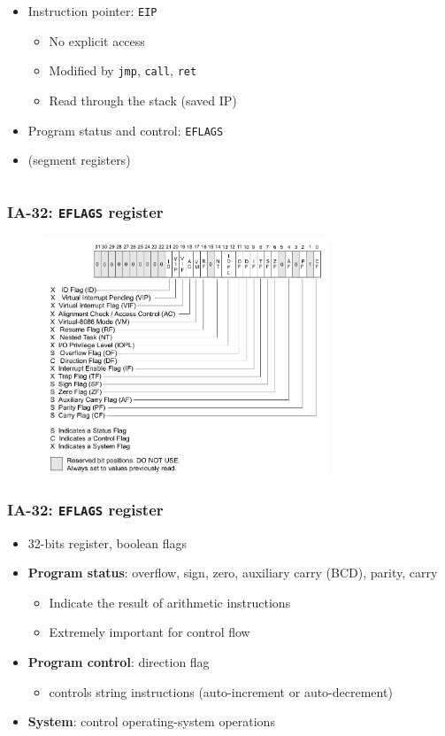 \documentclass[]{beamer}
\begin{document}
\begin{frame}
\begin{columns}
\begin{column}{2.7in}
\begin{itemize}
\begin{itemize}
	      		\end{itemize}
	      		\item Instruction pointer: {\tt EIP}
	      		\begin{itemize}
	      			\item No explicit access
	      			\item Modified by {\tt jmp}, {\tt call}, {\tt ret}
	      			\item Read through the stack (saved IP)
	      		\end{itemize}
	      		\item Program status and control: {\tt EFLAGS}
	      		\item (segment registers)
	      	\end{itemize}
    	\end{column}
  	\end{columns}
\end{frame}

\begin{frame}
	\frametitle{IA-32: {\tt EFLAGS} register}
	\begin{figure}
    	\includegraphics[height=2.8in]{images/intel-manual-eflags.png}
  	\end{figure}
\end{frame}

\begin{frame}
	\frametitle{IA-32: {\tt EFLAGS} register}
  	\begin{itemize}
  		\item 32-bits register, boolean flags
  		\item \textbf{Program status}: overflow, sign, zero, auxiliary carry (BCD), parity, carry
  		\begin{itemize}
  			\item Indicate the result of arithmetic instructions
  			\item Extremely important for control flow
  		\end{itemize}
  		\item \textbf{Program control}: direction flag
  		\begin{itemize}
  			\item controls string instructions (auto-increment or auto-decrement)
  		\end{itemize}
  		\item \textbf{System}: control operating-system operations
  \end{itemize}
 \end{frame}
\end{document}
